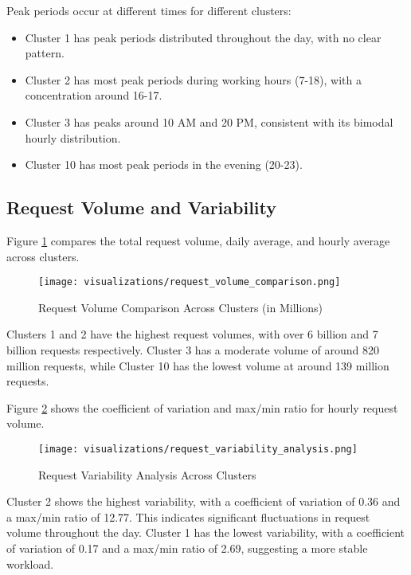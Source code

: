 \documentclass[conference]{IEEEtran}
\begin{document}
Peak periods occur at different times for different clusters:
\begin{itemize}
    \item Cluster 1 has peak periods distributed throughout the day, with no clear pattern.
    \item Cluster 2 has most peak periods during working hours (7-18), with a concentration around 16-17.
    \item Cluster 3 has peaks around 10 AM and 20 PM, consistent with its bimodal hourly distribution.
    \item Cluster 10 has most peak periods in the evening (20-23).
\end{itemize}

\subsection{Request Volume and Variability}
Figure \ref{fig:request_volume} compares the total request volume, daily average, and hourly average across clusters.

\begin{figure}[htbp]
    \centering
    \texttt{[image: visualizations/request\_volume\_comparison.png]}
    \caption{Request Volume Comparison Across Clusters (in Millions)}
    \label{fig:request_volume}
\end{figure}

Clusters 1 and 2 have the highest request volumes, with over 6 billion and 7 billion requests respectively. Cluster 3 has a moderate volume of around 820 million requests, while Cluster 10 has the lowest volume at around 139 million requests.

Figure \ref{fig:request_variability} shows the coefficient of variation and max/min ratio for hourly request volume.

\begin{figure}[htbp]
    \centering
    \texttt{[image: visualizations/request\_variability\_analysis.png]}
    \caption{Request Variability Analysis Across Clusters}
    \label{fig:request_variability}
\end{figure}

Cluster 2 shows the highest variability, with a coefficient of variation of 0.36 and a max/min ratio of 12.77. This indicates significant fluctuations in request volume throughout the day. Cluster 1 has the lowest variability, with a coefficient of variation of 0.17 and a max/min ratio of 2.69, suggesting a more stable workload.
\end{document}
